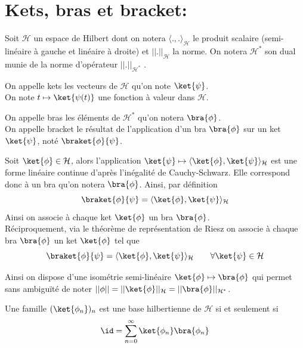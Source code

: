 
\section{Kets, bras et bracket:}

Soit $\mathcal{H}$ un espace de Hilbert dont on notera $\langle ., . \rangle_\mathcal{H}$ le produit scalaire (semi-linéaire à gauche et linéaire à droite) et $||.||_\mathcal{H}$ la norme. On notera $\mathcal{H}^*$ son dual munie de la norme d'opérateur $||.||_{\mathcal{H}^*}$ .

\begin{defi}[Ket]
On appelle kets les vecteurs de $\mathcal{H}$ qu'on note $\ket{\psi}$. \\
On note $t\mapsto\ket{\psi(t)}$ une fonction à valeur dans $\mathcal{H}$.
\end{defi}

\begin{defi}[Bra]
On appelle bras les éléments de $\mathcal{H}^*$ qu'on notera $\bra{\phi}$. \\ 
On appelle bracket le résultat de l'application d'un bra $\bra{\phi}$ sur un ket $\ket{\psi}$, noté $\braket{\phi}{\psi}$.
\end{defi}

Soit $\ket{\phi} \in \mathcal{H}$, alors l'application $\ket{\psi} \mapsto \langle \ket{\phi}, \ket{\psi}\rangle_\mathcal{H}$ est une forme linéaire continue d'après l'inégalité de Cauchy-Schwarz. Elle correspond donc à un bra qu'on notera $\bra{\phi}$. Ainsi, par définition 
$$\braket{\phi}{\psi} = \langle \ket{\phi}, \ket{\psi}\rangle_\mathcal{H}$$
Ainsi on associe à chaque ket $\ket{\phi}$ un bra $\bra{\phi}$. \\

Réciproquement, via le théorème de représentation de Riesz on associe à chaque bra $\bra{\phi}$ un ket $\ket{\phi}$ tel que 
$$\braket{\phi}{\psi} = \langle \ket{\phi}, \ket{\psi}\rangle_\mathcal{H} \qquad \forall \ket{\psi}\in \mathcal{H}$$

Ainsi on dispose d'une isométrie semi-linéaire $\ket{\phi} \mapsto \bra{\phi}$ qui permet sans ambiguïté de noter $||\phi|| = ||\ket{\phi}||_\mathcal{H} = ||\bra{\phi}||_{\mathcal{H}^*}$.  \\

\begin{pro}
Une famille $(\ket{\phi_n})_n$ est une base hilbertienne de $\mathcal{H}$ si et seulement si 
$$\id  = \sum_{n=0}^\infty \ket{\phi_n}\bra{\phi_n}$$
\end{pro}

